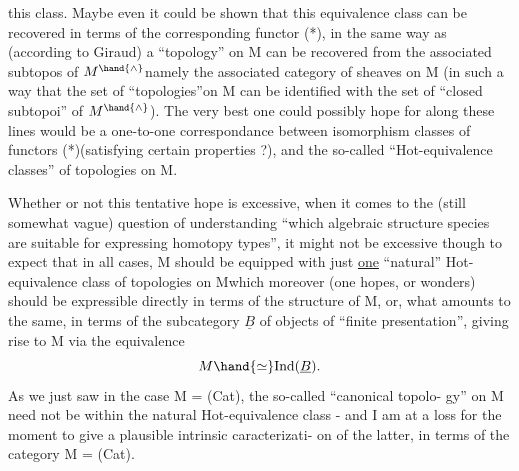 
this class.  Maybe even it could be shown that this equivalence class
can be recovered in terms of the corresponding functor (*),  in the same
way as (according to Giraud) a ``topology'' on M can be recovered from
the associated subtopos of $M^{\hand{\wedge}}$\hand{,}namely the associated category of sheaves
on M (in such a way that the set of ``topologies''on M can be
identified with the set of ``closed subtopoi'' of $M^{\hand{\wedge}}$).  The very best
one could possibly hope for along these lines would be a one-to-one
correspondance between isomorphism classes of functors (*)(satisfying
certain properties ?),  and the so-called ``Hot-equivalence classes'' of
topologies on M.

Whether or not this tentative hope is excessive, when it comes to
the (still somewhat vague) question of understanding ``which algebraic
structure species are suitable for expressing homotopy types'',  it
might not be excessive though to expect that in all  cases,  M should
be equipped with just \uline{one} ``natural'' Hot-equivalence class of topologies
on M\hand{,}which moreover (one hopes,  or wonders) should be expressible
directly in terms of the  structure of M,  or,  what amounts to the same,
in terms of the  subcategory $\underline{B}$ of objects of ``finite presentation'',  
giving rise to M via the equivalence
\[ M \hand{\simeq} \mathrm{Ind}(\underline{B}) . \]
As we just saw in the case  M = (Cat),  the so-called ``canonical topolo-%
gy'' on M need not be within the natural Hot-equivalence class  -  and I
am at a loss for the moment to give a plausible intrinsic caracterizati-%
on of the latter,  in terms of the category M = (Cat). 

